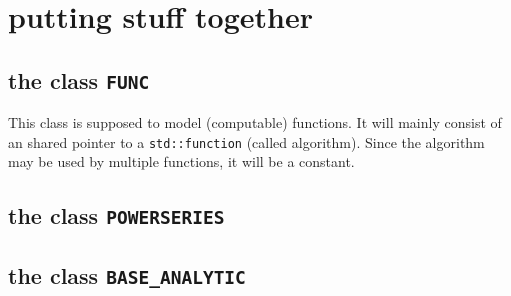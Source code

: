 \documentclass{article}
\begin{document}
\section{putting stuff together}

\subsection{the class \texttt{FUNC}}

This class is supposed to model (computable) functions. It will mainly consist of an shared pointer to a \texttt{std::function} (called algorithm). Since the algorithm may be used by multiple functions, it will be a constant.

\subsection{the class \texttt{POWERSERIES}}

\subsection{the class \texttt{BASE\_ANALYTIC}}
\end{document}
